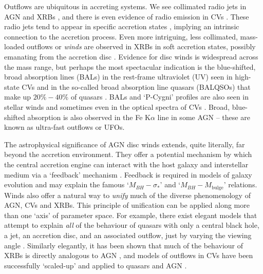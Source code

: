 Outflows are ubiquitous in accreting systems. We see collimated radio jets in AGN 
\citep{hazard1963,potash1980,perley1984,marscher2006} and XRBs \citep{bellonijet2010}, 
and there is even evidence of radio emission in
CVs \citep{benz1983,kordingDNjet2008,coppejans2015}. 
These radio jets tend to appear in specific 
accretion states \citep{fender2001,fender2004,kordingDNjet2008},
implying an intrinsic connection to the 
accretion process. Even more intriguing, less collimated, mass-loaded outflows
or {\em winds} are observed in XRBs in soft accretion states, 
possibly emanating from the accretion disc \citep{ponti2012}.
Evidence for disc winds is widespread across the mass range, 
but perhaps the most spectacular indication
is the blue-shifted, broad absorption lines (BALs) in the rest-frame ultraviolet (UV)
seen in high-state CVs \citep{heap1978,greensteinoke1982,cordova1982}
and in the so-called broad absorption line quasars (BALQSOs) that make up $20\%-40\%$
of quasars \citep{weymann1991,knigge2008,allen2011}. 
BALs and `P-Cygni' profiles \citep{struve1935,rottenburg1952}
are also seen in stellar winds \citep[e.g.][]{cassinelli1979} and sometimes even
in the optical spectra of CVs \citep{patterson1996, RN98, kafka2004}. 
Broad, blue-shifted absorption is also observed in the Fe K$\alpha$ line in 
some AGN \citep{reeves2003,poundsreeves2009,tombesi2010a} -- these are known
as ultra-fast outflows or UFOs.

The astrophysical significance of AGN disc winds extends, quite literally, 
far beyond the accretion environment. They offer a potential mechanism by which the central
accretion engine can interact with the host galaxy and interstellar medium 
via a `feedback' mechanism \citep{king2003,fabian2012}. 
Feedback is required in models of galaxy evolution \citep{springel2005}
and may explain the famous `$M_{BH}-\sigma_*$' \citep{silkrees1998,haring2004}
and `$M_{BH}-M_{\mathrm{bulge}}$' \citep{magorrian1998} relations.
Winds also offer a natural way to {\em unify} much
of the diverse phenomenology of AGN, CVs and XRBs. This principle of unification
can be applied along more than one `axis' of parameter space. For example, 
there exist elegant models that attempt to explain {\em all}
of the behaviour of quasars with only a central black hole, a jet, an accretion disc,
and an associated outflow, just by varying the viewing angle \citep{elvis2000}.
Similarly elegantly, it has been shown that much of the behaviour of XRBs
is directly analogous to AGN \citep{mchardy2006}, 
and models of outflows in CVs have been successfully `scaled-up'
and applied to quasars and AGN \citep[e.g.][]{higginbottom2013}.

